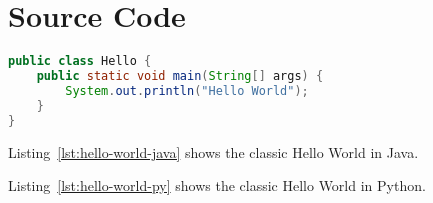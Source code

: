 \section{Source Code}

\begin{lstlisting}[language=Java, caption=Hello World in Java, label=lst:hello-world-java]
public class Hello {
    public static void main(String[] args) {
        System.out.println("Hello World");
    }
}
\end{lstlisting}

Listing~\ref{lst:hello-world-java} shows the classic Hello World in Java.



Listing~\ref{lst:hello-world-py} shows the classic Hello World in Python.
